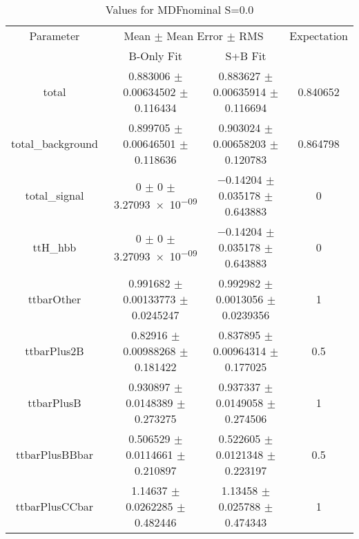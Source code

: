 \begin{table}
\centering
\caption{Values for MDFnominal S=0.0}
\begin{tabular}{cccc}
\toprule
Parameter & \multicolumn{2}{c}{Mean $\pm$ Mean Error $\pm$ RMS} & Expectation\\
 & B-Only Fit & S+B Fit & \\
\midrule
total & \num{0.883006} $\pm$ \num{0.00634502} $\pm$ \num{0.116434} & \num{0.883627} $\pm$ \num{0.00635914} $\pm$ \num{0.116694} & \num{0.840652}\\
total\_background & \num{0.899705} $\pm$ \num{0.00646501} $\pm$ \num{0.118636} & \num{0.903024} $\pm$ \num{0.00658203} $\pm$ \num{0.120783} & \num{0.864798}\\
total\_signal & \num{0} $\pm$ \num{0} $\pm$ \num{3.27093e-09} & \num{-0.14204} $\pm$ \num{0.035178} $\pm$ \num{0.643883} & \num{0}\\
ttH\_hbb & \num{0} $\pm$ \num{0} $\pm$ \num{3.27093e-09} & \num{-0.14204} $\pm$ \num{0.035178} $\pm$ \num{0.643883} & \num{0}\\
ttbarOther & \num{0.991682} $\pm$ \num{0.00133773} $\pm$ \num{0.0245247} & \num{0.992982} $\pm$ \num{0.0013056} $\pm$ \num{0.0239356} & \num{1}\\
ttbarPlus2B & \num{0.82916} $\pm$ \num{0.00988268} $\pm$ \num{0.181422} & \num{0.837895} $\pm$ \num{0.00964314} $\pm$ \num{0.177025} & \num{0.5}\\
ttbarPlusB & \num{0.930897} $\pm$ \num{0.0148389} $\pm$ \num{0.273275} & \num{0.937337} $\pm$ \num{0.0149058} $\pm$ \num{0.274506} & \num{1}\\
ttbarPlusBBbar & \num{0.506529} $\pm$ \num{0.0114661} $\pm$ \num{0.210897} & \num{0.522605} $\pm$ \num{0.0121348} $\pm$ \num{0.223197} & \num{0.5}\\
ttbarPlusCCbar & \num{1.14637} $\pm$ \num{0.0262285} $\pm$ \num{0.482446} & \num{1.13458} $\pm$ \num{0.025788} $\pm$ \num{0.474343} & \num{1}\\
\bottomrule
\end{tabular}
\end{table}